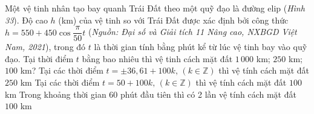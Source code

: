 \begin{ex}%
	Một vệ tinh nhân tạo bay quanh Trái Đất theo một quỹ đạo là đường elip (\textit{Hình 33}). Độ cao $h$ (km) của vệ tinh so với Trái Đất được xác định bởi công thức $h=550+450\cos \dfrac{\pi}{50}t$ (\textit{Nguồn: Đại số và Giải tích 11 Nâng cao, NXBGD Việt Nam, 2021}), trong đó $t$ là thời gian tính bằng phút kể từ lúc vệ tinh bay vào quỹ đạo. Tại thời điểm $t$ bằng bao nhiêu thì vệ tinh cách mặt đất $1\,000$ km; $250$ km; $100$ km?	
	{\True Tại các thời điểm $t=\pm36{,}61+100k,\,(k\in\mathbb{Z})$ thì vệ tính cách mặt đất $250$ km}
	{\True Tại các thời điểm $t=50+100k, \,(k\in\mathbb{Z})$ thì vệ tính cách mặt đất $100$ km}
	{Trong khoảng thời gian $60$ phút đầu tiên thì có 2 lần vệ tính cách mặt đất $100$ km}
\end{ex}

